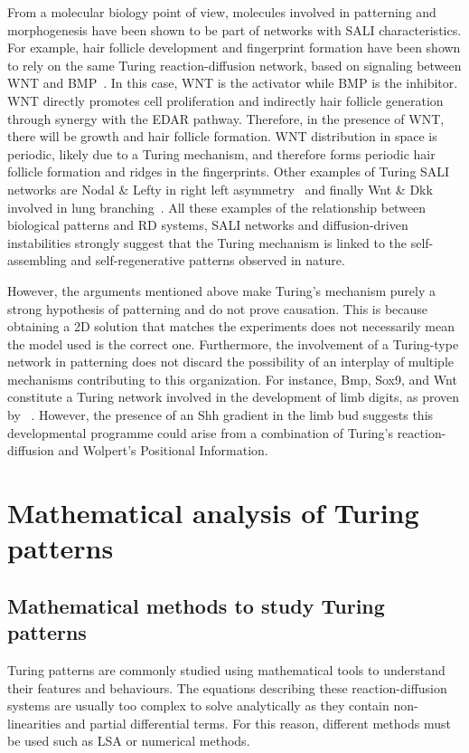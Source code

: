 From a molecular biology point of view, molecules involved in patterning and morphogenesis have been shown to be part of networks with SALI characteristics.
For example, hair follicle development and fingerprint formation have been shown to rely on the same Turing reaction-diffusion network, based on signaling between WNT and BMP~\parencite{Glover2023}.
In this case, WNT is the activator while BMP is the inhibitor.
WNT directly promotes cell proliferation and indirectly hair follicle generation through synergy with the EDAR pathway.
Therefore, in the presence of WNT, there will be growth and hair follicle formation.
WNT distribution in space is periodic, likely due to a Turing mechanism, and therefore forms periodic hair follicle formation and ridges in the fingerprints.
Other examples of Turing SALI networks are Nodal \& Lefty in right left asymmetry~\parencite{Nakamura2006} and finally Wnt \& Dkk involved in lung branching~\parencite{langhe2005_lung}.
All these examples of the relationship between biological patterns and RD systems, SALI networks and diffusion-driven instabilities strongly suggest that the Turing mechanism is linked to the self-assembling and self-regenerative patterns observed in nature.

However, the arguments mentioned above make Turing’s mechanism purely a strong hypothesis of patterning and do not prove causation.
This is because obtaining a 2D solution that matches the experiments does not necessarily mean the model used is the correct one.
Furthermore, the involvement of a Turing-type network in patterning does not discard the possibility of an interplay of multiple mechanisms contributing to this organization.
For instance, Bmp, Sox9, and Wnt constitute a Turing network involved in the development of limb digits, as proven by ~\cite{Raspopovic1}.
However, the presence of an Shh gradient in the limb bud suggests this developmental programme could arise from a combination of Turing's reaction-diffusion and Wolpert's Positional Information.


\section{Mathematical analysis of Turing patterns}

\subsection{Mathematical methods to study Turing patterns}
Turing patterns are commonly studied using mathematical tools to understand their features and behaviours.
The equations describing these reaction-diffusion systems are usually too complex to solve analytically as they contain non-linearities and partial differential terms.
For this reason, different methods must be used such as \acrfull{LSA} or numerical methods.

